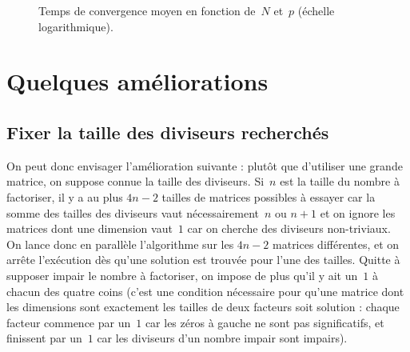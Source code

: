 \begin{figure}[hbt]
  \centering
  \caption{Temps de convergence moyen en fonction de~$N$ et~$p$ (échelle logarithmique).}
  \label{fig:p_ag}
\end{figure}  

\section{Quelques améliorations}

\subsection{Fixer la taille des diviseurs recherchés}

On peut donc envisager l'amélioration suivante : plutôt que d'utiliser une grande matrice, on suppose connue la taille des diviseurs. Si~$n$ est la taille du nombre à factoriser, il y a au plus $4n-2$ tailles de matrices possibles à essayer car la somme des tailles des diviseurs vaut nécessairement~$n$ ou $n+1$ et on ignore les matrices dont une dimension vaut~$1$ car on cherche des diviseurs non-triviaux. On lance donc en parallèle l'algorithme sur les $4n-2$ matrices différentes, et on arrête l'exécution dès qu'une solution est trouvée pour l'une des tailles. Quitte à supposer impair le nombre à factoriser, on impose de plus qu'il y ait un~$1$ à chacun des quatre coins (c'est une condition nécessaire pour qu'une matrice dont les dimensions sont exactement les tailles de deux facteurs soit solution : chaque facteur commence par un~$1$ car les zéros à gauche ne sont pas significatifs, et finissent par un~$1$ car les diviseurs d'un nombre impair sont impairs). 

